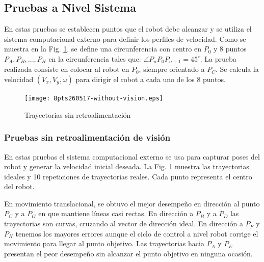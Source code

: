\documentclass[twocolumn,10pt]{amrob}
\begin{document}
\subsection*{Pruebas a Nivel Sistema} 
En estas pruebas se establecen puntos que el robot debe alcanzar y se utiliza el sistema computacional externo para definir los perfiles de velocidad. Como se muestra en la Fig. \ref{fig:8pts_without_vision}, se define una circunferencia con centro en $P_0$ y 8 puntos ${P_A, P_B, ..., P_H}$ en la circunferencia tales que: $\angle P_nP_0P_{n+1} = 45^\circ $. La prueba realizada consiste en colocar al robot en $P_0$, siempre orientado a $P_C$. Se calcula la velocidad $(V_x,V_y,\omega)$ para dirigir el robot a cada uno de los 8 puntos. 

\begin{figure}
  \centering
    \texttt{[image: 8pts260517-without-vision.eps]}
  \caption{Trayectorias sin retroalimentación}
  \label{fig:8pts_without_vision}
\end{figure}
\label{subsec:exper_res-pruebas_sin_vision}

\subsubsection*{Pruebas sin retroalimentación de visión}
En estas pruebas el sistema computacional externo se usa para capturar poses del robot y generar la velocidad inicial deseada. La Fig. \ref{fig:8pts_without_vision} muestra las trayectorias ideales y 10 repeticiones de trayectorias reales. Cada punto representa el centro del robot.


En movimiento translacional, se obtuvo el mejor desempeño en dirección al punto $P_C$ y a $P_G$ en que mantiene líneas casi rectas. En dirección a $P_B$ y a $P_D$ las trayectorias son curvas, cruzando al vector de dirección ideal. En dirección a $P_F$ y $P_H$ tenemos los mayores errores aunque el ciclo de control a nivel robot corrige el movimiento para llegar al punto objetivo. Las trayectorias hacia  $P_A$ y $P_E$ presentan el peor desempeño sin alcanzar el punto objetivo en ninguna ocasión. 
\end{document}
